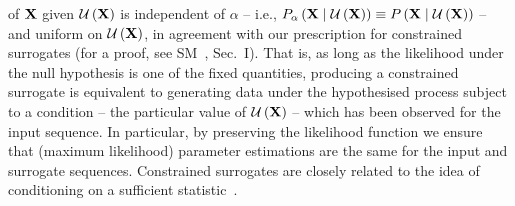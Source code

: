 \documentclass[%
prx,
reprint,
superscriptaddress,
nofootinbib,
 amsmath,amssymb,
 aps,
floatfix,
]{revtex4-2}
\begin{document}
of ${\bf X}$ given $\mathcal{U}\left( {\bf X} \right)$ is independent of $\alpha$ -- i.e., $P_\alpha\left( {\bf X} \mid \mathcal{U}\left( {\bf X} \right) \right) \equiv P\left( {\bf X} \mid \mathcal{U}\left( {\bf X} \right) \right)$ -- and uniform on $\mathcal{U}\left( {\bf X} \right)$, in agreement with our prescription for constrained surrogates (for a proof, see SM~\cite{supplemental}, {Sec.~I}). {That is, as long as the likelihood under the null hypothesis is one of the fixed quantities, producing a constrained surrogate is equivalent to generating data under the hypothesised process subject to a condition -- the particular value of $\mathcal{U}\left( {\bf X} \right)$ -- which has been observed for the input sequence. In particular, by preserving the likelihood function we ensure that (maximum likelihood) parameter estimations are the same for the input and surrogate sequences. } Constrained surrogates are closely related to the idea of conditioning on a sufficient statistic~\cite{fisher1922mathematical,reid1995roles,van1998testing,lehmann2005testing}.
\end{document}
